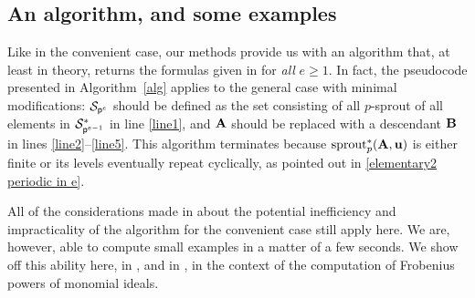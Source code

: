 \documentclass{article}
\begin{document}
\newpage
\subsection{An algorithm, and some examples}
\label{algorithm and examples: SS}

Like in the convenient case, our methods provide us with an algorithm that, at least in theory, returns the formulas given in  for \emph{all} $e \ge 1$.
In fact, the pseudocode presented in Algorithm~\ref{alg} applies to the general case with minimal modifications:
$\mathcal{S}_{\mathsf{p}^e}$ should be defined as the set consisting of all $p$-sprout of all elements in $\mathcal{S}^*_{\mathsf{p}^{e-1}}$ in line \ref{line1}, and $\mathbf{A}$ should be replaced with a descendant $\mathbf{B}$ in lines \ref{line2}--\ref{line5}.
This algorithm terminates because $\operatorname{sprout}^*_p(\mathbf{A},\mathbf{u})$ is either finite or its levels eventually repeat cyclically, as pointed out in \eqref{elementary2 periodic in e}.

All of the considerations made in  about the potential inefficiency and impracticality of the algorithm for the convenient case still apply here.
We are, however, able to compute small examples in a matter of a few seconds.
We show off this ability here, in , and in ,
in the context of the computation of Frobenius powers of monomial ideals.
\end{document}
